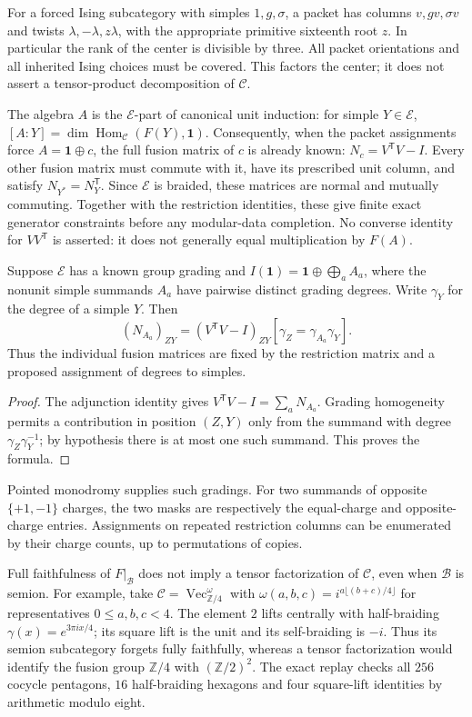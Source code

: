 For a forced Ising subcategory with simples $1,g,\sigma$, a packet has
columns $v,gv,\sigma v$ and twists $\lambda,-\lambda,z\lambda$, with
the appropriate primitive sixteenth root $z$. In particular the rank of
the center is divisible by three. All packet orientations and all
inherited Ising choices must be covered. This factors the center; it
does not assert a tensor-product decomposition of $\mathcal C$.

The algebra $A$ is the $\mathcal E$-part of canonical unit induction:
for simple $Y\in\mathcal E$,
$[A:Y]=\dim\operatorname{Hom}_{\mathcal C}(F(Y),\mathbf1)$.
Consequently, when the packet assignments force $A=\mathbf1\oplus c$,
the full fusion matrix of $c$ is already known:
$N_c=V^{\mathsf T}V-I$. Every other fusion matrix must commute with it,
have its prescribed unit column, and satisfy
$N_{Y^*}=N_Y^{\mathsf T}$. Since $\mathcal E$ is braided, these matrices
are normal and mutually commuting. Together with the restriction
identities, these give finite exact generator constraints before any
modular-data completion. No converse identity for $VV^{\mathsf T}$ is
asserted: it does not generally equal multiplication by $F(A)$.

\begin{corollary}
\label{cor:graded-adjunction-splitting}
Suppose $\mathcal E$ has a known group grading and
$I(\mathbf1)=\mathbf1\oplus\bigoplus_a A_a$, where the nonunit
simple summands $A_a$ have pairwise distinct grading degrees.
Write $\gamma_Y$ for the degree of a simple $Y$. Then
\[
 (N_{A_a})_{ZY}=(V^{\mathsf T}V-I)_{ZY}
       [\gamma_Z=\gamma_{A_a}\gamma_Y].
\]
Thus the individual fusion matrices are fixed by the restriction
matrix and a proposed assignment of degrees to simples.
\end{corollary}
\begin{proof}
The adjunction identity gives $V^{\mathsf T}V-I=\sum_aN_{A_a}$.
Grading homogeneity permits a contribution in position $(Z,Y)$ only
from the summand with degree $\gamma_Z\gamma_Y^{-1}$; by hypothesis
there is at most one such summand. This proves the formula.
\end{proof}
Pointed monodromy supplies such gradings. For two summands of opposite
$\{+1,-1\}$ charges, the two masks are respectively the equal-charge
and opposite-charge entries. Assignments on repeated restriction columns
can be enumerated by their charge counts, up to permutations of copies.


Full faithfulness of $F|_{\mathcal B}$ does not imply a tensor factorization
of $\mathcal C$, even when $\mathcal B$ is semion. For example, take
$\mathcal C=\operatorname{Vec}_{\mathbb Z/4}^{\omega}$ with
$\omega(a,b,c)=i^{a\lfloor(b+c)/4\rfloor}$ for representatives
$0\le a,b,c<4$. The element $2$ lifts centrally with half-braiding
$\gamma(x)=e^{3\pi ix/4}$; its square lift is the unit and its
self-braiding is $-i$. Thus its semion subcategory forgets fully
faithfully, whereas a tensor factorization would identify the fusion
group $\mathbb Z/4$ with $(\mathbb Z/2)^2$.
The exact replay  checks all
$256$ cocycle pentagons, $16$ half-braiding hexagons and four square-lift
identities by arithmetic modulo eight.


